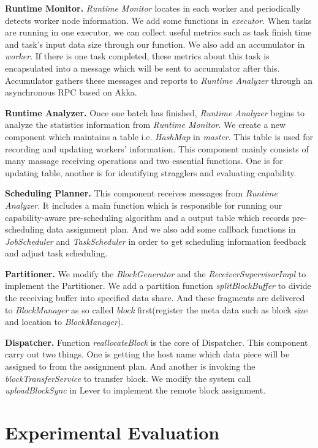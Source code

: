 \documentclass[10pt,conference,compsocconf,letterpaper]{IEEEtran}
\begin{document}
  \textbf{Runtime Monitor.} \emph{Runtime Monitor} locates in each worker and periodically detects worker node information. We add some functions in \emph{executor}. When tasks are running in one executor, we can collect useful metrics such as task finish time and task's input data size through our function. We also add an accumulator in \emph{worker}. If there is one task completed, these metrics about this task is encapsulated into a message which will be sent to accumulator after this. Accumulator gathers these messages and reports to \emph{Runtime Analyzer} through an asynchronous RPC based on Akka.

  \textbf{Runtime Analyzer.} Once one batch has finished, \emph{Runtime Analyzer} begins to analyze the statistics information from \emph{Runtime Monitor}. We create a new component which maintains a table i.e. \emph{HashMap} in \emph{master}. This table is used for recording and updating workers' information. This component mainly consists of many massage receiving operations and two essential functions. One is for updating table, another is for identifying stragglers and evaluating capability.

  \textbf{Scheduling Planner.} This component receives messages from \emph{Runtime Analyzer}. It includes a main function which is responsible for running our capability-aware pre-scheduling algorithm and a output table which records pre-scheduling data assignment plan. And we also add some callback functions in \emph{JobScheduler} and \emph{TaskScheduler} in order to get scheduling information feedback and adjust task scheduling.

  \textbf{Partitioner.} We modify the \emph{BlockGenerator} and the \emph{ReceiverSupervisorImpl} to implement the Partitioner. We add a partition function \emph{splitBlockBuffer} to divide the receiving buffer into specified data share. And these fragments are delivered to \emph{BlockManager} as so called \emph{block} first(register the meta data such as block size and location to \emph{BlockManager}).

  \textbf{Dispatcher.} Function \emph{reallocateBlock} is the core of Dispatcher. This component carry out two things. One is getting the host name which data piece will be assigned to from the assignment plan. And another is invoking the \emph{blockTransferService} to transfer block. We modify the system call \emph{uploadBlockSync} in Lever to implement the remote block assignment.

\section{Experimental Evaluation}
\end{document}
